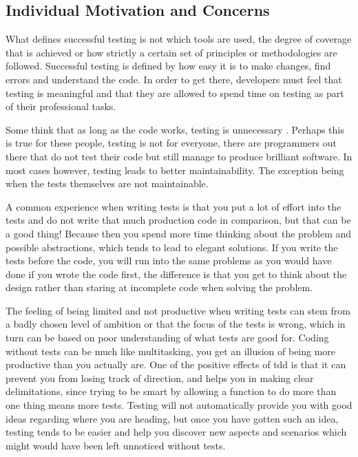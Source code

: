 \documentclass[11pt]{article}
\begin{document}
\subsection{Individual Motivation and Concerns}
\label{subsec:motivationconcerns}

What defines successful testing is not which tools are used, the degree of coverage that is achieved or how strictly a certain set of principles or methodologies are followed. Successful testing is defined by how easy it is to make changes, find errors and understand the code. In order to get there, developers must feel that testing is meaningful and that they are allowed to spend time on testing as part of their professional tasks.

Some think that as long as the code works, testing is unnecessary \cite[question~13]{Ahnve}. Perhaps this is true for these people, testing is not for everyone, there are programmers out there that do not test their code but still manage to produce brilliant software. In most cases however, testing leads to better maintainability. The exception being when the tests themselves are not maintainable. \cite[question~33]{Ahnve}\cite[question~28]{Edelstam}

A common experience when writing tests is that you put a lot of effort into the tests and do not write that much production code in comparison, but that can be a good thing! Because then you spend more time thinking about the problem and possible abstractions, which tends to lead to elegant solutions. If you write the tests before the code, you will run into the same problems as you would have done if you wrote the code first, the difference is that you get to think about the design rather than staring at incomplete code when solving the problem. \cite[question~8]{Edelstam}

The feeling of being limited and not productive when writing tests can stem from a badly chosen level of ambition or that the focus of the tests is wrong, which in turn can be based on poor understanding of what tests are good for. Coding without tests can be much like multitasking, you get an illusion of being more productive than you actually are. One of the positive effects of \gls{tdd} is that it can prevent you from losing track of direction, and helps you in making clear delimitations, since trying to be smart by allowing a function to do more than one thing means more tests. Testing will not automatically provide you with good ideas regarding where you are heading, but once you have gotten such an idea, testing tends to be easier and help you discover new aspects and scenarios which might would have been left unnoticed without tests. \cite[question~8]{Edelstam}
\end{document}

